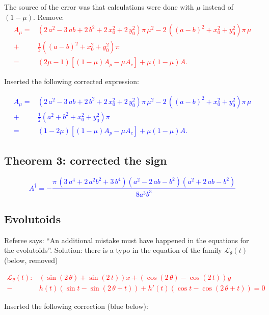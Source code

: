 The source of the error was that calculations were done with $ \mu$ instead of $(1-\mu)$. Remove:
\textcolor{red}{\begin{align*} A_{\mu}=& \left(2\,{a}^{2}-3\,ab+2\,b^{2}+2\,x_0^{2}+2\,y_0^{2} \right) \pi\,{\mu}^2 -2\,\left( (a-b)^2  +x_0^{2}
+y_0^{2} \right) \pi\,\mu \\
+&\frac{1}{2}\left( (a-b)^2 +x_0^{2}+y_0^{2} \right) \pi\\
  =&(2\mu-1)[(1-\mu) A_p-\mu A_c]+\mu(1-\mu)A. 
\end{align*}
}

Inserted the following corrected expression:

\textcolor{blue}{ 
\begin{align*}
A_{\mu}=& \left(2\,{a}^{2}-3\,ab+2\,b^{2}+2\,x_0^{2}+2\,y_0^{2} \right) \pi\,{\mu}^2 -2\,\left( (a-b)^2  +x_0^{2}
+y_0^{2} \right) \pi\,\mu \\
+&\frac{1}{2}\left( a^2+b^2 +x_0^{2}+y_0^{2} \right) \pi\\
  =&(1-2\mu)[(1-\mu) A_p-\mu A_c]+\mu(1-\mu)A. 
\end{align*}
}

\subsection{Theorem 3: corrected the sign}
  
 \textcolor{blue}{
 	\[ A^\dagger=  -  \frac {\pi\, \left( 3\,{a}^{4}+2\,{a}^{2}{b}^{2}+3\,{b}^{4}
 \right)  \left( {a}^{2}-2\,ab-{b}^{2} \right)  \left( {a}^{2}+2\,ab-{
b}^{2} \right) }{8 a^{3} b^{3}}
	\]
 }
 \subsection{Evolutoids}
 Referee says: ``An additional mistake must have happened in the equations for the evolutoids''. Solution: there is a typo in the equation of the family $\mathcal{L}_{\theta}(t)$ (below, removed)

\textcolor{red}{ 
\begin{align*} 
\mathcal{L}_{\theta}(t):& \left( \sin \left( 2\,\theta \right) +\sin \left( 2\,t \right) 
\right) x+ \left( \cos \left( 2\,\theta \right) -\cos \left( 2\,t
\right)  \right) y\\
-&h(t)  (  \sin t - 
 \sin \left( 2\,\theta+t \right) )+  h '(t)   (  \cos t -\cos
\left( 2\,\theta+t \right) )=0
\end{align*}
}

Inserted the following correction (blue below):   

